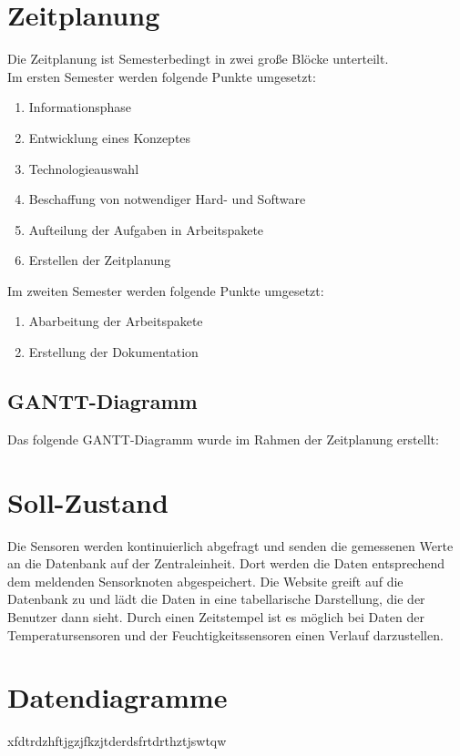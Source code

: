 \section{Zeitplanung}

Die Zeitplanung ist Semesterbedingt in zwei große Blöcke unterteilt.\\
Im ersten Semester werden folgende Punkte umgesetzt:

\begin{enumerate}
  \item Informationsphase
  \item Entwicklung eines Konzeptes
  \item Technologieauswahl
  \item Beschaffung von notwendiger Hard- und Software
  \item Aufteilung der Aufgaben in Arbeitspakete
  \item Erstellen der Zeitplanung
\end{enumerate}

Im zweiten Semester werden folgende Punkte umgesetzt:

\begin{enumerate}
  \item Abarbeitung der Arbeitspakete
  \item Erstellung der Dokumentation
\end{enumerate}

\subsection*{GANTT-Diagramm}

Das folgende GANTT-Diagramm wurde im Rahmen der Zeitplanung erstellt:

\section*{Soll-Zustand}
Die Sensoren werden kontinuierlich abgefragt und senden die gemessenen Werte an
die Datenbank auf der Zentraleinheit. Dort werden die Daten entsprechend dem
meldenden Sensorknoten abgespeichert. Die Website greift auf die Datenbank zu
und lädt die Daten in eine tabellarische Darstellung, die der Benutzer dann
sieht. Durch einen Zeitstempel ist es möglich bei Daten der Temperatursensoren
und der Feuchtigkeitssensoren einen Verlauf darzustellen.

\section*{Datendiagramme}
xfdtrdzhftjgzjfkzjtderdsfrtdrthztjswtqw
